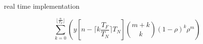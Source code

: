 \documentclass{sigchi}
\begin{document}
real time implementation

\begin{equation}
	\sum_{k=0}^{\lfloor \frac{n}{T_F} \rfloor}\left(y[n - \lceil k\frac{T_F}{T_N}\rceil T_N] \binom{m+k}{k} (1 - \rho)^{k} \rho^m\right)
\end{equation}














\end{document}
